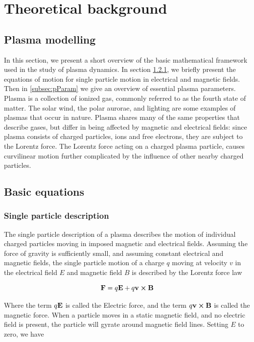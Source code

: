 \chapter{Theoretical background}

\label{sec:theory}

\section{Plasma modelling}
In this section, we present a short overview of the basic mathematical framework used in the study of plasma dynamics. In section \cref{subsec:basicEq}, we briefly present the equations of motion for single particle motion in electrical and magnetic fields. Then in \cref{subsec:pParam} we give an overview of essential plasma parameters.
Plasma is a collection of ionized gas, commonly referred to as the fourth state of matter. The solar wind, the polar aurorae, and lighting are some examples of plasmas that occur in nature.  Plasma shares many of the same properties that describe gases, but differ in being affected by magnetic and electrical fields: since plasma consists of charged particles, ions and free electrons, they are subject to the Lorentz force. The Lorentz force acting on a charged plasma particle, causes curvilinear motion further complicated by the influence of other nearby charged particles.

\section{Basic equations}

\subsection{Single particle description}
\label{subsec:basicEq}
The single particle description of a plasma describes the motion of individual charged particles moving in imposed magnetic and electrical fields. Assuming the force of gravity is sufficiently small, and assuming constant electrical and magnetic fields, the single particle motion of a charge $q$ moving at velocity $v$ in the electrical field $E$ and magnetic field $B$ is described by the Lorentz force law 

\begin{equation}\label{eq:lorentz}
    \vb{F} = q \vb{E} + q \vb{v} \cp \vb{B}
\end{equation}

Where the term $q \vb{E}$ is called the Electric force, and the term $q\vb{v} \cp \vb{B}$ is called the magnetic force. When a particle moves in a static magnetic field, and no electric field is present, the particle will gyrate around magnetic field lines. Setting $E$ to zero, we have

